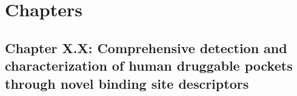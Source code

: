 
\chapter{Chapters}
\newpage

















\section{Chapter X.X: Comprehensive detection and characterization of human druggable pockets through novel binding site descriptors}




